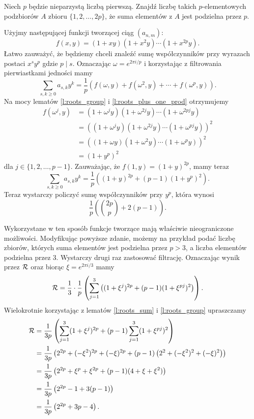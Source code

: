 \documentclass{scrartcl}
\begin{document}
    \begin{example}[IMO 1995/6]
        Niech $p$ będzie nieparzystą liczbą pierwszą. Znajdź liczbę takich $p$-elementowych podzbiorów $A$ zbioru $\{1,2,\ldots,2p\}$, że suma elementów z $A$ jest podzielna przez $p$.
    \end{example}
    \begin{solution}
        Użyjmy następującej funkcji tworzącej ciąg $(a_{n,m})$:
        $$ f(x, y) = (1 + xy)(1 + x^2y)\cdots(1 + x^{2p}y). $$
        Łatwo zauważyć, że będziemy chceli znaleźć sumę współczynników przy wyrazach postaci $x^s y^p$ gdzie $p\mid s$. Oznaczając $\omega = e^{2\pi i / p}$ i korzystając z filtrowania pierwiastkami jedności mamy
        $$ \sum_{s,k\geq 0} a_{s,k}y^k = \frac{1}{p}\left(f(\omega, y) + f(\omega^2, y) + \cdots + f(\omega^p, y)\right). $$
        Na mocy lematów \ref{l:roots_group} i \ref{l:roots_plus_one_prod} otrzymujemy
        \begin{align*}
            f(\omega^j, y) &= (1 + \omega^j y)(1 + \omega^{2j}y)\cdots(1 + \omega^{2pj}y) \\
                           &= \left((1 + \omega^j y)(1 + \omega^{2j}y)\cdots(1 + \omega^{pj}y)\right)^2 \\
                           &= \left((1 + \omega y)(1 + \omega^2 y)\cdots(1 + \omega^p y)\right)^2 \\
                           &= (1 + y^p)^2
        \end{align*}
        dla $j \in\{1, 2, \ldots, p-1\}$. Zauważając, że $f(1, y) = (1 + y)^{2p}$, mamy teraz
        $$ \sum_{s,k\geq 0} a_{s,k}y^k = \frac{1}{p}\left((1 + y)^{2p} + (p - 1)(1 + y^p)^2\right). $$
        Teraz wystarczy policzyć sumę współczynników przy $y^p$, która wynosi
        $$ \frac{1}{p}\left(\binom{2p}{p} + 2(p - 1)\right). $$
    \end{solution}

    Wykorzystane w ten sposób funkcje tworzące mają właściwie nieograniczone możliwości. Modyfikując powyższe zdanie, możemy na przykład podać liczbę zbiorów, których suma elementów jest podzielna przez $p > 3$, a liczba elementów podzielna przez $3$. Wystarczy drugi raz zastosować filtrację. Oznaczając wynik przez $\mathcal R$ oraz biorąc $\xi = e^{2\pi i / 3}$ mamy
    $$ \mathcal R = \frac{1}{3}\cdot\frac{1}{p}\left(\sum_{j = 1}^3\left((1 + \xi^j)^{2p} + (p - 1)(1 + \xi^{pj})^2\right)\right). $$
    Wielokrotnie korzystając z lematów \ref{l:roots_sum} i \ref{l:roots_group} upraszczamy
    \begin{align*}
        \mathcal R &= \frac{1}{3p}\left(\sum_{j = 1}^3 (1 + \xi^j)^{2p} + (p - 1)\sum_{j = 1}^3 (1 + \xi^{pj})^2\right) \\
          &= \frac{1}{3p}\left(2^{2p} + (-\xi^2)^{2p} + (-\xi)^{2p} + (p - 1)\left(2^2 + (-\xi^2)^2 + (-\xi)^2\right)\right) \\
          &= \frac{1}{3p}\left(2^{2p} + \xi^p + \xi^{2p} + (p - 1)(4 + \xi + \xi^2)\right) \\
          &= \frac{1}{3p}\left(2^{2p} - 1 + 3(p - 1)\right) \\
          &= \frac{1}{3p}\left(2^{2p} + 3p - 4\right).
    \end{align*}
\end{document}
